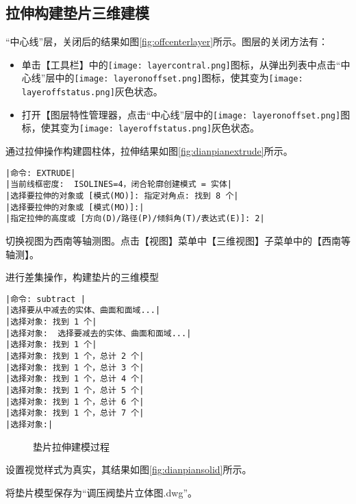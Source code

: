 \subsection{拉伸构建垫片三维建模}
\begin{procedure}
“中心线”层，关闭后的结果如图\ref{fig:offcenterlayer}所示。图层的关闭方法有：
\begin{itemize}
\item 单击【工具栏】中的\texttt{[image: layercontral.png]}图标，从弹出列表中点击“中心线”层中的\texttt{[image: layeronoffset.png]}图标，使其变为\texttt{[image: layeroffstatus.png]}灰色状态。
\item 打开【图层特性管理器，点击“中心线”层中的\texttt{[image: layeronoffset.png]}图标，使其变为\texttt{[image: layeroffstatus.png]}灰色状态。
\end{itemize}
\item 通过拉伸操作构建圆柱体，拉伸结果如图\ref{fig:dianpianextrude}所示。
\begin{lstlisting}
|命令: EXTRUDE|
|当前线框密度:  ISOLINES=4，闭合轮廓创建模式 = 实体|
|选择要拉伸的对象或 [模式(MO)]: 指定对角点: 找到 8 个|
|选择要拉伸的对象或 [模式(MO)]:|
|指定拉伸的高度或 [方向(D)/路径(P)/倾斜角(T)/表达式(E)]: 2|
\end{lstlisting}
\item 切换视图为西南等轴测图。点击【视图】菜单中【三维视图】子菜单中的【西南等轴测】。
\item 进行差集操作，构建垫片的三维模型
\begin{lstlisting}
|命令: subtract |
|选择要从中减去的实体、曲面和面域...|
|选择对象: 找到 1 个|
|选择对象:  选择要减去的实体、曲面和面域...|
|选择对象: 找到 1 个|
|选择对象: 找到 1 个，总计 2 个|
|选择对象: 找到 1 个，总计 3 个|
|选择对象: 找到 1 个，总计 4 个|
|选择对象: 找到 1 个，总计 5 个|
|选择对象: 找到 1 个，总计 6 个|
|选择对象: 找到 1 个，总计 7 个|
|选择对象:|
\end{lstlisting}
\begin{figure}[htbp]
\centering
{}\hspace{20pt}
\hspace{20pt}
\caption{垫片拉伸建模过程}
\end{figure}
\item 设置视觉样式为真实，其结果如图\ref{fig:dianpiansolid}所示。
\item 将垫片模型保存为“调压阀垫片立体图.dwg”。
\end{procedure}

